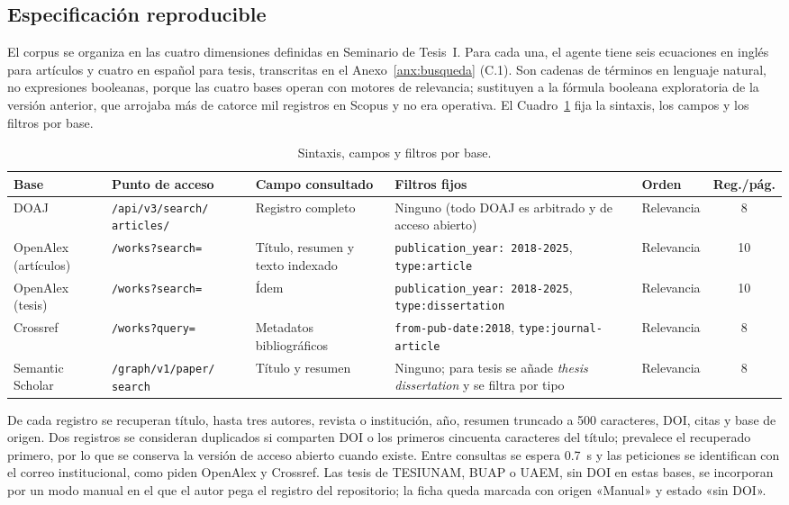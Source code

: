 \documentclass[letter,12pt]{article}
\begin{document}
\subsection{Especificación reproducible}

El corpus se organiza en las cuatro dimensiones definidas en Seminario de Tesis~I. Para cada una, el agente tiene seis ecuaciones en inglés para artículos y cuatro en español para tesis, transcritas en el Anexo~\ref{anx:busqueda} (C.1). Son cadenas de términos en lenguaje natural, no expresiones booleanas, porque las cuatro bases operan con motores de relevancia; sustituyen a la fórmula booleana exploratoria de la versión anterior, que arrojaba más de catorce mil registros en Scopus y no era operativa. El Cuadro~\ref{tab:sintaxis} fija la sintaxis, los campos y los filtros por base.

\begin{table}[H]
\centering
\scriptsize
\caption{Sintaxis, campos y filtros por base.}
\label{tab:sintaxis}
\renewcommand{\arraystretch}{1.35}
\begin{tabular}{|p{1.9cm}|p{2.9cm}|p{2.5cm}|p{3.3cm}|p{1.4cm}|c|}
\hline
\rowcolor{bgCotejo}
\textbf{Base} & \textbf{Punto de acceso} & \textbf{Campo consultado} & \textbf{Filtros fijos} & \textbf{Orden} & \textbf{Reg./pág.} \\
\hline
DOAJ & \texttt{/api/v3/search/ articles/} & Registro completo & Ninguno (todo DOAJ es arbitrado y de acceso abierto) & Relevancia & 8 \\
\hline
OpenAlex (artículos) & \texttt{/works?search=} & Título, resumen y texto indexado & \texttt{publication\_year: 2018-2025}, \texttt{type:article} & Relevancia & 10 \\
\hline
OpenAlex (tesis) & \texttt{/works?search=} & Ídem & \texttt{publication\_year: 2018-2025}, \texttt{type:dissertation} & Relevancia & 10 \\
\hline
Crossref & \texttt{/works?query=} & Metadatos bibliográficos & \texttt{from-pub-date:2018}, \texttt{type:journal-article} & Relevancia & 8 \\
\hline
Semantic Scholar & \texttt{/graph/v1/paper/ search} & Título y resumen & Ninguno; para tesis se añade \textit{thesis dissertation} y se filtra por tipo & Relevancia & 8 \\
\hline
\end{tabular}
\end{table}

De cada registro se recuperan título, hasta tres autores, revista o institución, año, resumen truncado a 500 caracteres, DOI, citas y base de origen. Dos registros se consideran duplicados si comparten DOI o los primeros cincuenta caracteres del título; prevalece el recuperado primero, por lo que se conserva la versión de acceso abierto cuando existe. Entre consultas se espera 0.7~s y las peticiones se identifican con el correo institucional, como piden OpenAlex y Crossref. Las tesis de TESIUNAM, BUAP o UAEM, sin DOI en estas bases, se incorporan por un modo manual en el que el autor pega el registro del repositorio; la ficha queda marcada con origen «Manual» y estado «sin DOI».
\end{document}
